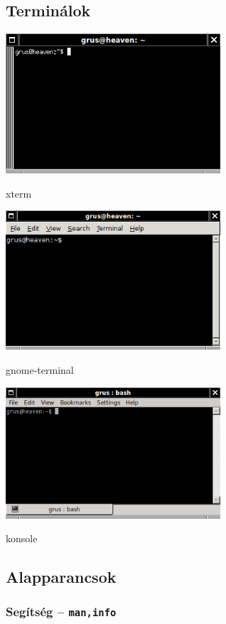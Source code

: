 \subsection{Terminálok}

\begin{center}
\includegraphics[width=0.6\textwidth]{pics/xterm}

xterm\bigskip


\includegraphics[width=0.6\textwidth]{pics/gnome-terminal}

gnome-terminal\bigskip

\includegraphics[width=0.6\textwidth]{pics/konsole}

konsole
\end{center}
\pagebreak

\subsection{Alapparancsok}
\subsubsection*{Segítség -- \texttt{man,info}}
\medskip

